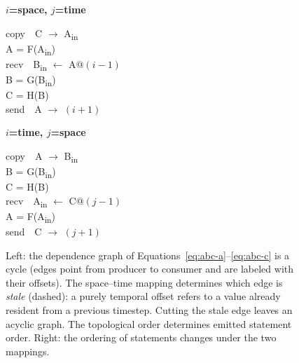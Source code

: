\documentclass[sigplan, nonacm]{acmart}
\begin{document}
\begin{figure}[t]
\begin{minipage}[c]{0.60\textwidth}
\end{minipage}\hfill
\begin{minipage}[c]{0.36\textwidth}
\centering
\small
\begin{minipage}[t]{0.48\linewidth}
\centering
\textbf{$i$=space, $j$=time}
\begin{flushleft}\ttfamily\footnotesize
copy\ \ C $\to$ A\textsubscript{in}\\
A = F(A\textsubscript{in})\\
recv\ \ B\textsubscript{in} $\leftarrow$ A@$(i{-}1)$\\
B = G(B\textsubscript{in})\\
C = H(B)\\
send\ \ A $\to$ $(i{+}1)$
\end{flushleft}
\end{minipage}%
\hfill
\begin{minipage}[t]{0.48\linewidth}
\centering
\textbf{$i$=time, $j$=space}
\begin{flushleft}\ttfamily\footnotesize
copy\ \ A $\to$ B\textsubscript{in}\\
B = G(B\textsubscript{in})\\
C = H(B)\\
recv\ \ A\textsubscript{in} $\leftarrow$ C@$(j{-}1)$\\
A = F(A\textsubscript{in})\\
send\ \ C $\to$ $(j{+}1)$
\end{flushleft}
\end{minipage}
\end{minipage}
\caption{Left: the dependence graph of
Equations~\ref{eq:abc-a}--\ref{eq:abc-c} is a cycle (edges point from
producer to consumer and are labeled with their offsets). The space--time
mapping determines which edge is \emph{stale} (dashed): a purely temporal
offset refers to a value already resident from a previous timestep. Cutting
the stale edge leaves an acyclic graph. The topological order determines emitted statement order. Right: the ordering of statements changes under the two mappings. }
\label{fig:dep-cycle}
\label{fig:emitted-ir}
\end{figure}
\end{document}
